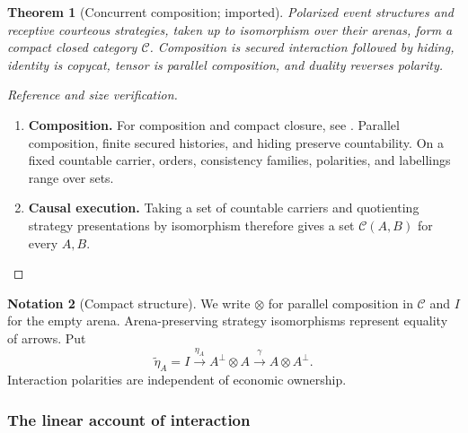 \documentclass[11pt,a4paper]{article}
\numberwithin{equation}{section}
\newtheorem{theorem}{Theorem}[section]
\theoremstyle{definition}
\newtheorem{notation}[theorem]{Notation}
\theoremstyle{remark}
\theoremstyle{plain}
\begin{document}
\begin{theorem}[Concurrent composition; imported]
\label{thm:egt-base}
Polarized event structures and receptive courteous strategies, taken up to
isomorphism over their arenas, form a compact closed category $\mathcal C$.
Composition is secured interaction followed by hiding, identity is copycat,
tensor is parallel composition, and duality reverses polarity.
\end{theorem}

\begin{proof}[Reference and size verification]
\leavevmode
\begin{enumerate}[label=\textup{(\arabic*)},leftmargin=*,itemsep=4pt,topsep=3pt]
  \item \textbf{Composition.} For composition and compact closure, see
\citet{CastellanEtAl2017}. Parallel composition, finite secured histories,
and hiding preserve countability. On a fixed countable carrier, orders,
consistency families, polarities, and labellings range over sets.
  \item \textbf{Causal execution.} Taking a
set of countable carriers and quotienting strategy presentations by
isomorphism therefore gives a set $\mathcal C(A,B)$ for every $A,B$.
\end{enumerate}
\end{proof}

\begin{notation}[Compact structure]
We write $\otimes$ for parallel composition in $\mathcal C$ and $I$ for the
empty arena. Arena-preserving strategy isomorphisms represent equality of
arrows. Put
\[
 \widetilde\eta_A=
 I\xrightarrow{\eta_A}A^\perp\otimes A
 \xrightarrow{\gamma}A\otimes A^\perp.
\]
Interaction polarities are independent of economic ownership.
\end{notation}

\subsubsection{The linear account of interaction}
\end{document}
